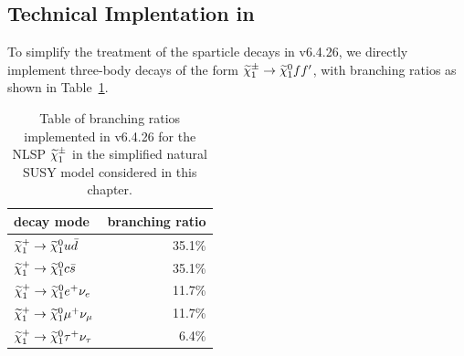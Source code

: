 \subsection{Technical Implentation in \PYTHIA}
To simplify the treatment of the sparticle decays in \PYTHIA v6.4.26, we directly implement three-body decays of
the form $\widetilde{\chi}^{\pm}_1 \to \widetilde{\chi}^{0}_1 f f^{\prime}$, with branching ratios
as shown in Table~\ref{tab:nlspbr}.
\begin{table}
\centering
\begin{tabular}{l|r}
decay mode & branching ratio \\\hline
$\widetilde{\chi}^{+}_1 \to \widetilde{\chi}^{0}_1 u \bar d$ &  35.1\%\\
$\widetilde{\chi}^{+}_1 \to \widetilde{\chi}^{0}_1 c \bar s$ &  35.1\%\\
$\widetilde{\chi}^{+}_1 \to \widetilde{\chi}^{0}_1 e^+ \nu_e$ &  11.7\%\\
$\widetilde{\chi}^{+}_1 \to \widetilde{\chi}^{0}_1 \mu^+ \nu_{\mu}$ &  11.7\%\\
$\widetilde{\chi}^{+}_1 \to \widetilde{\chi}^{0}_1 \tau^+ \nu_{\tau}$ &  6.4\%
\end{tabular}
\caption{\label{tab:nlspbr}Table of branching ratios implemented in
  \PYTHIA v6.4.26 for the NLSP
  $\widetilde{\chi}^{\pm}_1$ in the simplified natural SUSY model considered in this chapter.}
\end{table}